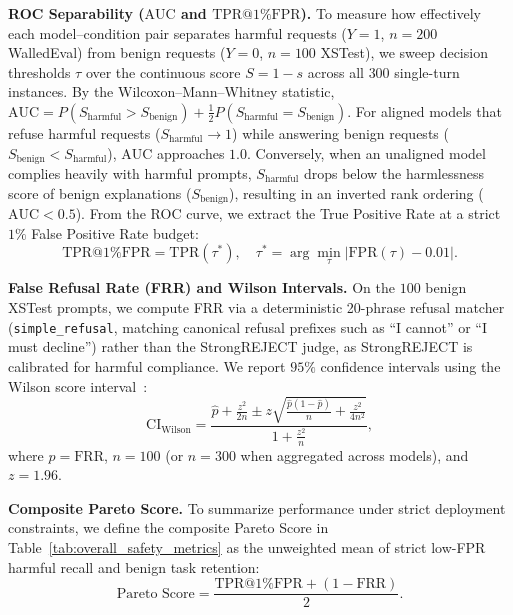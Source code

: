 \documentclass[10pt, twocolumn]{article}
\begin{document}
\textbf{ROC Separability ($\text{AUC}$ and $\text{TPR@1\%FPR}$).} To measure how effectively each model--condition pair separates harmful requests ($Y = 1$, $n=200$ WalledEval) from benign requests ($Y = 0$, $n=100$ XSTest), we sweep decision thresholds $\tau$ over the continuous score $S = 1 - s$ across all $300$ single-turn instances. By the Wilcoxon--Mann--Whitney statistic, $\text{AUC} = P(S_{\text{harmful}} > S_{\text{benign}}) + \frac{1}{2}P(S_{\text{harmful}} = S_{\text{benign}})$. For aligned models that refuse harmful requests ($S_{\text{harmful}} \to 1$) while answering benign requests ($S_{\text{benign}} < S_{\text{harmful}}$), $\text{AUC}$ approaches $1.0$. Conversely, when an unaligned model complies heavily with harmful prompts, $S_{\text{harmful}}$ drops below the harmlessness score of benign explanations ($S_{\text{benign}}$), resulting in an inverted rank ordering ($\text{AUC} < 0.5$). From the ROC curve, we extract the True Positive Rate at a strict $1\%$ False Positive Rate budget:
\begin{equation}
    \text{TPR@1\%FPR} = \text{TPR}(\tau^*), \quad \tau^* = \arg\min_{\tau} \left|\text{FPR}(\tau) - 0.01\right|.
\end{equation}

\textbf{False Refusal Rate (FRR) and Wilson Intervals.} On the $100$ benign XSTest prompts, we compute FRR via a deterministic 20-phrase refusal matcher (\texttt{simple\_refusal}, matching canonical refusal prefixes such as ``I cannot'' or ``I must decline'') rather than the StrongREJECT judge, as StrongREJECT is calibrated for harmful compliance. We report $95\%$ confidence intervals using the Wilson score interval~\citep{wilson1927probable}:
\begin{equation}
    \text{CI}_{\text{Wilson}} = \frac{\hat{p} + \frac{z^2}{2n} \pm z \sqrt{\frac{\hat{p}(1-\hat{p})}{n} + \frac{z^2}{4n^2}}}{1 + \frac{z^2}{n}},
\end{equation}
where $\hat{p} = \text{FRR}$, $n = 100$ (or $n = 300$ when aggregated across models), and $z = 1.96$.

\textbf{Composite Pareto Score.} To summarize performance under strict deployment constraints, we define the composite Pareto Score in Table~\ref{tab:overall_safety_metrics} as the unweighted mean of strict low-FPR harmful recall and benign task retention:
\begin{equation}
    \text{Pareto Score} = \frac{\text{TPR@1\%FPR} + (1 - \text{FRR})}{2}.
\end{equation}
\end{document}
